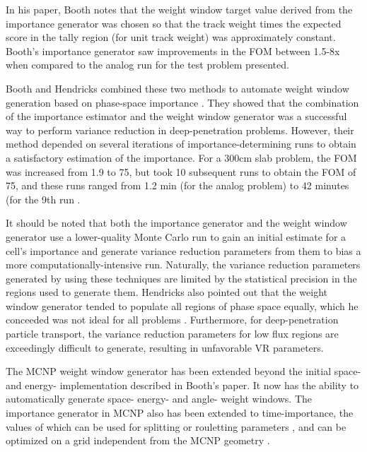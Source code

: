 In his
paper, Booth notes that the weight window target value derived from the
importance generator was chosen so that the
track weight times the expected score in the tally region (for unit track
weight) was approximately constant. Booth's importance generator saw
improvements in the FOM between 1.5-8x when compared to the analog run for the
test problem presented. 

Booth and Hendricks combined these two methods to
automate weight window generation based on phase-space importance
\cite{booth_deep_1982, booth_importance_1984}. They showed that the combination
of the importance estimator and the weight window generator was a successful way
to perform variance reduction in deep-penetration problems. However, their
method depended on several iterations of importance-determining runs to obtain a
satisfactory estimation of the importance. For a 300cm slab problem, the FOM was
increased from 1.9 to 75, but took 10 subsequent runs to obtain the FOM of 75,
and these runs ranged from 1.2 min (for the analog problem) to 42 minutes (for
the 9th run \cite{booth_importance_1984}.

It should be noted that both the importance generator and the weight window
generator use a lower-quality
Monte Carlo run to gain an initial estimate for a cell's importance and generate
variance reduction parameters from them to bias a more computationally-intensive
run. Naturally, the variance reduction parameters generated by using these
techniques are limited by the statistical precision in the regions used to
generate them. Hendricks also pointed out that the weight window generator
tended to populate all regions of phase space equally, which he conceeded was
not ideal for all problems \cite{hendricks_code-generated_1982}.
Furthermore, for deep-penetration particle transport, the
variance reduction parameters for low flux regions are exceedingly difficult to
generate, resulting in unfavorable VR parameters.

The MCNP \cite{mcnp_manual_v1, brown_mcnp_2002} weight window generator has been
extended beyond the initial space- and energy- implementation described in
Booth's paper. It now has the ability to automatically generate space- energy-
and angle- weight windows. The importance generator in MCNP also has been
extended to time-importance, the values of which can be used for splitting or
rouletting parameters \cite{brown_mcnp_2002}, and can be optimized on a grid
independent from the MCNP geometry \cite{evans_enhanced_1998}.

